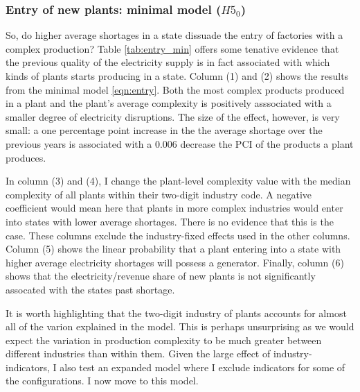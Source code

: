 \documentclass[11pt]{article}
\begin{document}
\subsubsection{Entry of new plants: minimal model ($H5_0$)}

So, do higher average shortages in a state dissuade the entry of factories with a complex production? Table \ref{tab:entry_min} offers some tenative evidence that the previous quality of the electricity supply is in fact associated with which kinds of plants starts producing in a state. Column (1) and (2) shows the results from the minimal model \ref{eqn:entry}. Both the most complex products produced in a plant and the plant's average complexity is positively asssociated with a smaller degree of electricity disruptions. The size of the effect, however, is very small: a one percentage point increase in the the average shortage over the previous years is associated with a 0.006 decrease the PCI of the products a plant produces.

In column (3) and (4), I change the plant-level complexity value with the median complexity of all plants within their two-digit industry code. A negative coefficient would mean here that plants in more complex industries would enter into states with lower average shortages. There is no evidence that this is the case. These columns exclude the industry-fixed effects used in the other columns. Column (5) shows the linear probability that a plant entering into a state with higher average electricity shortages will possess a generator. Finally, column (6) shows that the electricity/revenue share of new plants is not significantly assocated with the states past shortage.

It is worth highlighting that the two-digit industry of plants accounts for almost all of the varion explained in the model. This is perhaps unsurprising as we would expect the variation in production complexity to be much greater between different industries than within them. Given the large effect of industry-indicators, I also test an expanded model where I exclude indicators for some of the configurations. I now move to this model.
\end{document}
